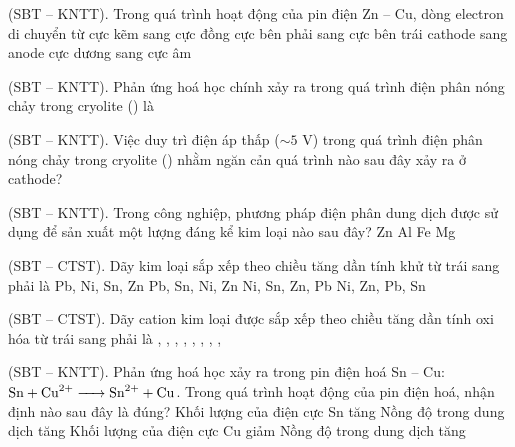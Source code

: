 \documentclass[11pt,a4paper]{article}
\def\loigiai#1{}
\begin{document}
\begin{ex}
(SBT -- KNTT). Trong quá trình hoạt động của pin điện Zn -- Cu, dòng electron di chuyển từ
\choice
{cực kẽm sang cực đồng}
{cực bên phải sang cực bên trái}
{cathode sang anode}
{cực dương sang cực âm}
\loigiai{}
\end{ex}

\begin{ex}
(SBT -- KNTT). Phản ứng hoá học chính xảy ra trong quá trình điện phân nóng chảy  trong cryolite () là
\choice
{}
{}
{}
{}
\loigiai{}
\end{ex}

\begin{ex}
(SBT -- KNTT). Việc duy trì điện áp thấp ($\sim 5\text{ V}$) trong quá trình điện phân nóng chảy  trong cryolite () nhằm ngăn cản quá trình nào sau đây xảy ra ở cathode?
\choice
{}
{}
{}
{}
\loigiai{}
\end{ex}

\begin{ex}
(SBT -- KNTT). Trong công nghiệp, phương pháp điện phân dung dịch được sử dụng để sản xuất một lượng đáng kể kim loại nào sau đây?
\choice
{Zn}
{Al}
{Fe}
{Mg}
\loigiai{}
\end{ex}

\begin{ex}
(SBT -- CTST). Dãy kim loại sắp xếp theo chiều tăng dần tính khử từ trái sang phải là
\choice
{Pb, Ni, Sn, Zn}
{Pb, Sn, Ni, Zn}
{Ni, Sn, Zn, Pb}
{Ni, Zn, Pb, Sn}
\loigiai{}
\end{ex}

\begin{ex}
(SBT -- CTST). Dãy cation kim loại được sắp xếp theo chiều tăng dần tính oxi hóa từ trái sang phải là
\choice
{, , }
{, , }
{, , }
{, , }
\loigiai{}
\end{ex}

\begin{ex}
(SBT -- KNTT). Phản ứng hoá học xảy ra trong pin điện hoá Sn -- Cu: $\ce{Sn + Cu^2+ -> Sn^2+ + Cu}$. Trong quá trình hoạt động của pin điện hoá, nhận định nào sau đây là đúng?
\choice
{Khối lượng của điện cực Sn tăng}
{Nồng độ  trong dung dịch tăng}
{Khối lượng của điện cực Cu giảm}
{Nồng độ  trong dung dịch tăng}
\loigiai{}
\end{ex}
\end{document}

